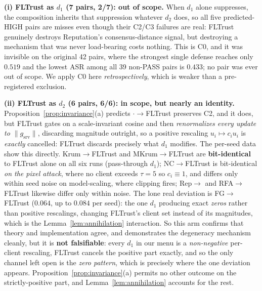 \documentclass{article}
\begin{document}
\textbf{(i) FLTrust as $d_1$ (7 pairs, 2/7): out of scope.} When $d_1$ alone suppresses, the composition inherits that suppression whatever $d_2$ does, so all five predicted-HIGH pairs are misses even though their C2/C3 failures are real: FLTrust genuinely destroys Reputation's consensus-distance signal, but destroying a mechanism that was never load-bearing costs nothing. This is C0, and it was invisible on the original 42 pairs, where the strongest single defense reaches only $0.519$ and the lowest ASR among all 39 non-PASS pairs is $0.433$; no pair was ever out of scope. We apply C0 here \emph{retrospectively}, which is weaker than a pre-registered exclusion.

\textbf{(ii) FLTrust as $d_2$ (6 pairs, 6/6): in scope, but nearly an identity.} Proposition~\ref{prop:invariance}(a) predicts $\cdot\to$FLTrust preserves C2, and it does, but FLTrust gates on a scale-invariant cosine and then \emph{renormalizes every update to $\|g_{\mathrm{srv}}\|$}, discarding magnitude outright, so a positive rescaling $u_i \mapsto c_i u_i$ is \emph{exactly} cancelled: FLTrust discards precisely what $d_1$ modifies. The per-seed data show this directly. Krum$\to$FLTrust and MKrum$\to$FLTrust are \textbf{bit-identical} to FLTrust alone on all six runs (pass-through $d_1$); NC$\to$FLTrust is bit-identical \emph{on the pixel attack}, where no client exceeds $\tau{=}5$ so $c_i \equiv 1$, and differs only within seed noise on model-scaling, where clipping fires; Rep$\to$ and RFA$\to$FLTrust likewise differ only within noise. The lone real deviation is FG$\to$FLTrust ($0.064$, up to $0.084$ per seed): the one $d_1$ producing exact \emph{zeros} rather than positive rescalings, changing FLTrust's client set instead of its magnitudes, which is the Lemma~\ref{lem:annihilation} interaction. So this arm confirms that theory and implementation agree, and demonstrates the degeneracy mechanism cleanly, but it is \textbf{not falsifiable}: every $d_1$ in our menu is a \emph{non-negative} per-client rescaling, FLTrust cancels the positive part exactly, and so the only channel left open is the \emph{zero pattern}, which is precisely where the one deviation appears. Proposition~\ref{prop:invariance}(a) permits no other outcome on the strictly-positive part, and Lemma~\ref{lem:annihilation} accounts for the rest.
\end{document}
